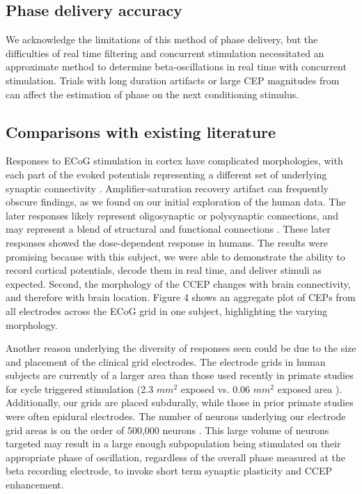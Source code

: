 \subsection{Phase delivery accuracy}
We acknowledge the limitations of this method of phase delivery, but the difficulties of real time filtering and concurrent stimulation necessitated an approximate method to determine beta-oscillations in real time with concurrent stimulation. Trials with long duration artifacts or large CEP magnitudes from can affect the estimation of phase on the next conditioning stimulus. 

\subsection{Comparisons with existing literature}
Responses to ECoG stimulation in cortex have complicated morphologies, with each part of the evoked potentials representing a different set of underlying synaptic connectivity \cite{Keller2014e}. Amplifier-saturation recovery artifact can frequently obscure findings, as we found on our initial exploration of the human data. The later responses likely represent oligosynaptic or polysynaptic connections, and may represent a blend of structural and functional connections \cite{Keller2014e}. These later responses showed the dose-dependent response in humans. The results were promising because with this subject, we were able to demonstrate the ability to record cortical potentials, decode them in real time, and deliver stimuli as expected. Second, the morphology of the CCEP changes with brain connectivity, and therefore with brain location. Figure 4 shows an aggregate plot of CEPs from all electrodes across the ECoG grid in one subject, highlighting the varying morphology.

Another reason underlying the diversity of responses seen could be due to the size and placement of the clinical grid electrodes. The electrode grids in human subjects are currently of a larger area than those used recently in primate studies for cycle triggered stimulation (2.3 $mm^2$ exposed vs. 0.06 $mm^2$ exposed area \cite{Rembado2017,Zanos2018}). Additionally, our grids are placed subdurally, while those in prior primate studies were often epidural electrodes. The number of neurons underlying our electrode grid areas is on the order of 500,000 neurons \cite{Miller2009a}. This large volume of neurons targeted may result in a large enough subpopulation being stimulated on their appropriate phase of oscillation, regardless of the overall phase measured at the beta recording electrode, to invoke short term synaptic plasticity and CCEP enhancement. 


